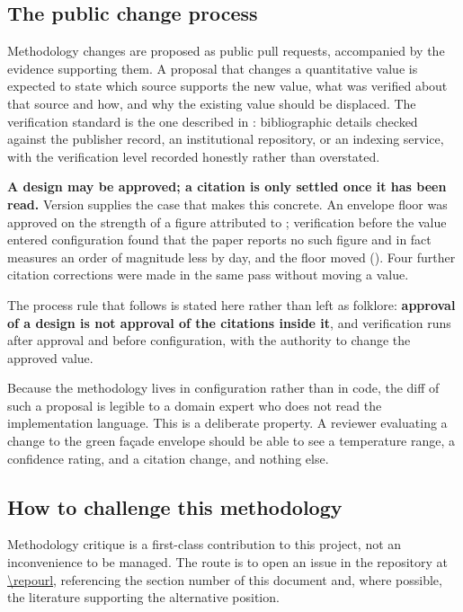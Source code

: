\subsection{The public change process}

Methodology changes are proposed as public pull requests, accompanied by the
evidence supporting them. A proposal that changes a quantitative value is
expected to state which source supports the new value, what was verified about
that source and how, and why the existing value should be displaced. The
verification standard is the one described in :
bibliographic details checked against the publisher record, an institutional
repository, or an indexing service, with the verification level recorded
honestly rather than overstated.

\begin{keynote}
\noindent\textbf{A design may be approved; a citation is only settled once it
has been read.} Version \methver{} supplies the case that makes this concrete.
An envelope floor was approved on the strength of a figure attributed to
\textcite{yao2023a}; verification before the value entered configuration found
that the paper reports no such figure and in fact measures an order of
magnitude less by day, and the floor moved (). Four
further citation corrections were made in the same pass without moving a value.

The process rule that follows is stated here rather than left as folklore:
\textbf{approval of a design is not approval of the citations inside it}, and
verification runs after approval and before configuration, with the authority
to change the approved value.
\end{keynote}

Because the methodology lives in configuration rather than in code, the diff of
such a proposal is legible to a domain expert who does not read the
implementation language. This is a deliberate property. A reviewer evaluating a
change to the green fa\c{c}ade envelope should be able to see a temperature
range, a confidence rating, and a citation change, and nothing else.

\subsection{How to challenge this methodology}

Methodology critique is a first-class contribution to this project, not an
inconvenience to be managed. The route is to open an issue in the repository
at \url{\repourl}, referencing the section number of this document and, where
possible, the literature supporting the alternative position.

